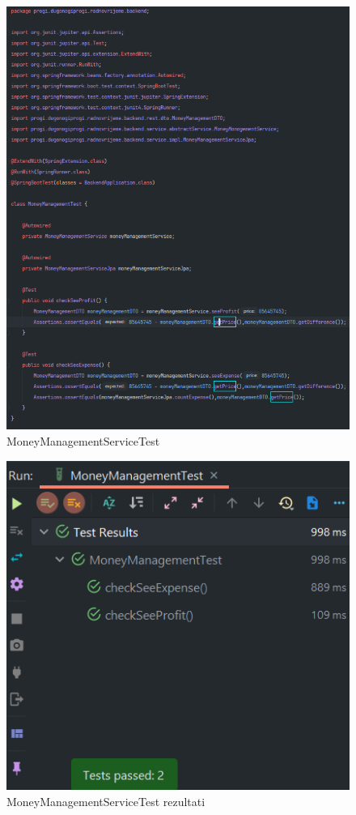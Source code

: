 				\begin{figure}[H] 					\centering 				\includegraphics[width=\textwidth]{Dokumentacija/ispit-komp/MoneyManagementtest.png}
				\caption{MoneyManagementServiceTest}
				\end{figure}
                \begin{figure}[H] 					\centering 					                    \includegraphics[width=\textwidth]{Dokumentacija/ispit-komp/MoneyManagementResult.png}
				\caption{MoneyManagementServiceTest rezultati}
				\end{figure}
				
